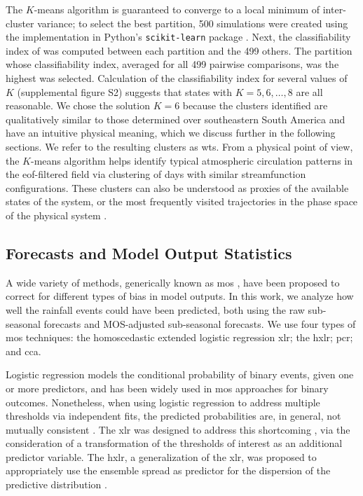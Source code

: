 \documentclass{ametsoc}
\begin{document}
The $K$-means algorithm is guaranteed to converge to a local minimum of inter-cluster variance; to select the best partition, 500 simulations were created using the implementation in Python's \texttt{scikit-learn} package \citep{Pedregosa2012}.
Next, the classifiability index of \citet{Michelangeli1995} was computed between each partition and the 499 others.
The partition whose classifiability index, averaged for all 499 pairwise comparisons, was the highest was selected.
Calculation of the classifiability index for several values of $K$ (supplemental figure S2) suggests that states with $K=5,6,\ldots,8$ are all reasonable.
We chose the solution $K=6$ because the clusters identified are qualitatively similar to those determined over southeastern South America \citep{Munoz2015,Munoz2016} and have an intuitive physical meaning, which we discuss further in the following sections.
We refer to the resulting clusters as \glspl{wt}.
From a physical point of view, the $K$-means algorithm helps identify typical atmospheric circulation patterns in the \gls{eof}-filtered field via clustering of days with similar streamfunction configurations.
These clusters can also be understood as proxies  of the available states of the system, or the most frequently visited trajectories in the phase space of the physical system \citep{Munoz2015,Munoz2016a,Munoz2017}.

\subsection{Forecasts and Model Output Statistics}

A wide variety of methods, generically known as \gls{mos} \citep{Glahn1972}, have been proposed to correct for different types of bias in model outputs.
In this work, we analyze how well the rainfall events could have been predicted, both using the raw sub-seasonal forecasts and  MOS-adjusted sub-seasonal forecasts.
We use  four types of \gls{mos} techniques: the homoscedastic extended logistic regression \gls{xlr}; the \gls{hxlr}; \gls{pcr}; and \gls{cca}.

Logistic regression models the conditional probability of binary events, given one or more predictors, and has been widely used in \gls{mos} approaches for binary outcomes.
Nonetheless, when using logistic regression to address multiple thresholds via independent fits, the predicted probabilities are, in general, not mutually consistent \citep{Messner2014}.
The \gls{xlr} was designed to address this shortcoming \citep{Wilks2009}, via the consideration of a transformation of the thresholds of interest as an additional predictor variable.
The \gls{hxlr}, a generalization of the \gls{xlr}, was proposed to appropriately use the ensemble spread as predictor for the dispersion of the predictive distribution \citep{Messner2014}.
\end{document}

